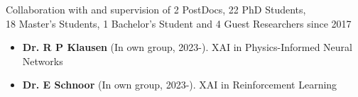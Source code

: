 
\newcommand{\supervision}[3]{\textbf{#1} (In own group, #2). {\small #3}}
\newcommand{\cosupervision}[4]{\textbf{#1} (#2, #3, co-supervision). {\small #4}}

\ifdefined\shortcv
    {
        \hspace*{\fill} Collaboration with and supervision of 2 PostDocs, 22 PhD Students,\\
        \hspace*{\fill} 18 Master's Students, 1 Bachelor's Student and 4 Guest Researchers since 2017
        }
\else
        {
            \begin{itemize}
                \item [] \supervision{Dr. R P Klausen}{2023-}{XAI in Physics-Informed Neural Networks}
                \item [] \supervision{Dr. E Schnoor}{2023-}{XAI in Reinforcement Learning}
            \end{itemize}
        }

